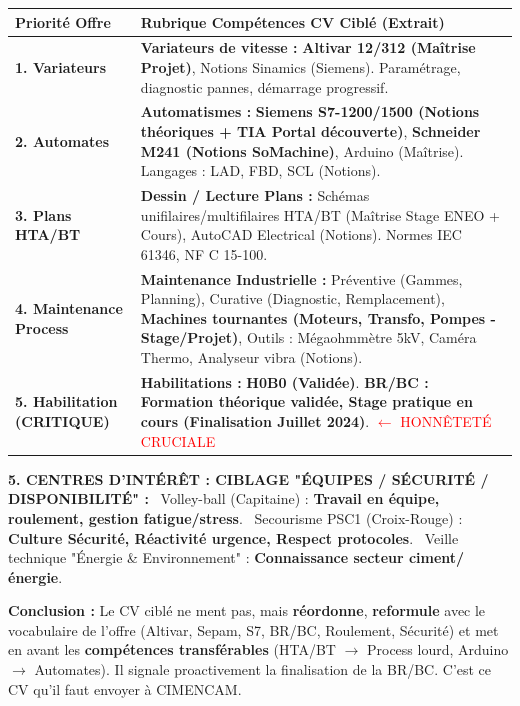 \documentclass[11pt]{article}
\begin{document}
\begin{exoresolu}
\begin{center}
\begin{tabularx}{\linewidth}{|l|X|}
\hline
\rowcolor{popblueL}
\textbf{Priorité Offre} & \textbf{Rubrique Compétences CV Ciblé (Extrait)} \\
\hline
\textbf{1. Variateurs} & \textbf{Variateurs de vitesse :} \textbf{Altivar 12/312 (Maîtrise Projet)}, Notions Sinamics (Siemens). Paramétrage, diagnostic pannes, démarrage progressif. \\
\hline
\textbf{2. Automates} & \textbf{Automatismes :} \textbf{Siemens S7-1200/1500 (Notions théoriques + TIA Portal découverte)}, \textbf{Schneider M241 (Notions SoMachine)}, Arduino (Maîtrise). Langages : LAD, FBD, SCL (Notions). \\
\hline
\textbf{3. Plans HTA/BT} & \textbf{Dessin / Lecture Plans :} Schémas unifilaires/multifilaires HTA/BT (Maîtrise Stage ENEO + Cours), AutoCAD Electrical (Notions). Normes IEC 61346, NF C 15-100. \\
\hline
\textbf{4. Maintenance Process} & \textbf{Maintenance Industrielle :} Préventive (Gammes, Planning), Curative (Diagnostic, Remplacement), \textbf{Machines tournantes (Moteurs, Transfo, Pompes - Stage/Projet)}, Outils : Mégaohmmètre 5kV, Caméra Thermo, Analyseur vibra (Notions). \\
\hline
\textbf{5. Habilitation (CRITIQUE)} & \textbf{Habilitations :} \textbf{H0B0 (Validée)}. \textbf{BR/BC : Formation théorique validée, Stage pratique en cours (Finalisation Juillet 2024)}. \textcolor{red}{$\leftarrow$ HONNÊTETÉ CRUCIALE} \\
\hline
\end{tabularx}
\end{center}

\medskip
\noindent \textbf{5. CENTRES D'INTÉRÊT : CIBLAGE "ÉQUIPES / SÉCURITÉ / DISPONIBILITÉ" :}
\textbullet\ Volley-ball (Capitaine) : \textbf{Travail en équipe, roulement, gestion fatigue/stress}.
\textbullet\ Secourisme PSC1 (Croix-Rouge) : \textbf{Culture Sécurité, Réactivité urgence, Respect protocoles}.
\textbullet\ Veille technique "Énergie \& Environnement" : \textbf{Connaissance secteur ciment/énergie}.

\medskip
\noindent \textbf{Conclusion :} Le CV ciblé ne ment pas, mais \textbf{réordonne}, \textbf{reformule} avec le vocabulaire de l'offre (Altivar, Sepam, S7, BR/BC, Roulement, Sécurité) et met en avant les \textbf{compétences transférables} (HTA/BT $\rightarrow$ Process lourd, Arduino $\rightarrow$ Automates). Il signale proactivement la finalisation de la BR/BC. C'est ce CV qu'il faut envoyer à CIMENCAM.
\end{exoresolu}
\end{document}
